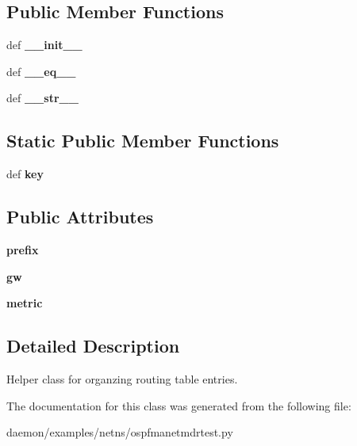 \subsection*{Public Member Functions}
\begin{DoxyCompactItemize}
\item 
\hypertarget{classospfmanetmdrtest_1_1_route_a4ed87740df41ca2757bae523e3e74295}{def {\bfseries \+\_\+\+\_\+init\+\_\+\+\_\+}}\label{classospfmanetmdrtest_1_1_route_a4ed87740df41ca2757bae523e3e74295}

\item 
\hypertarget{classospfmanetmdrtest_1_1_route_ab1f1e27b2cc6eb31c1a1c29c9204eb91}{def {\bfseries \+\_\+\+\_\+eq\+\_\+\+\_\+}}\label{classospfmanetmdrtest_1_1_route_ab1f1e27b2cc6eb31c1a1c29c9204eb91}

\item 
\hypertarget{classospfmanetmdrtest_1_1_route_ac0a5f887534f84de2449ade9a9760ef7}{def {\bfseries \+\_\+\+\_\+str\+\_\+\+\_\+}}\label{classospfmanetmdrtest_1_1_route_ac0a5f887534f84de2449ade9a9760ef7}

\end{DoxyCompactItemize}
\subsection*{Static Public Member Functions}
\begin{DoxyCompactItemize}
\item 
\hypertarget{classospfmanetmdrtest_1_1_route_ae8bdce7b359d8caff2a5368b0a3b5f1a}{def {\bfseries key}}\label{classospfmanetmdrtest_1_1_route_ae8bdce7b359d8caff2a5368b0a3b5f1a}

\end{DoxyCompactItemize}
\subsection*{Public Attributes}
\begin{DoxyCompactItemize}
\item 
\hypertarget{classospfmanetmdrtest_1_1_route_a913fd27ed99995e1df6e6d7be503872b}{{\bfseries prefix}}\label{classospfmanetmdrtest_1_1_route_a913fd27ed99995e1df6e6d7be503872b}

\item 
\hypertarget{classospfmanetmdrtest_1_1_route_a479ac2f3bb7fb27d507c88a4267faeec}{{\bfseries gw}}\label{classospfmanetmdrtest_1_1_route_a479ac2f3bb7fb27d507c88a4267faeec}

\item 
\hypertarget{classospfmanetmdrtest_1_1_route_ac4918cc8c19e7064537e36b45762a777}{{\bfseries metric}}\label{classospfmanetmdrtest_1_1_route_ac4918cc8c19e7064537e36b45762a777}

\end{DoxyCompactItemize}


\subsection{Detailed Description}
\begin{DoxyVerb}Helper class for organzing routing table entries. \end{DoxyVerb}
 

The documentation for this class was generated from the following file\+:\begin{DoxyCompactItemize}
\item 
daemon/examples/netns/ospfmanetmdrtest.\+py\end{DoxyCompactItemize}
